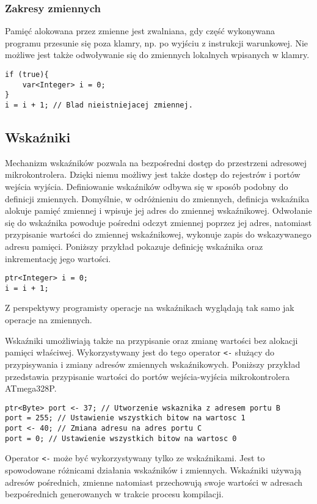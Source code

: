 \subsubsection{Zakresy zmiennych}
Pamięć alokowana przez zmienne jest zwalniana, gdy część wykonywana programu przesunie się poza klamry, np. po wyjściu z instrukcji warunkowej. Nie możliwe jest także odwoływanie się do zmiennych lokalnych wpisanych w klamry.
\begin{lstlisting}
if (true){
	var<Integer> i = 0;
}
i = i + 1; // Blad nieistniejacej zmiennej.
\end{lstlisting}
\subsection{Wskaźniki}
Mechanizm wskaźników pozwala na bezpośredni dostęp do przestrzeni adresowej mikrokontrolera. Dzięki niemu możliwy jest także dostęp do rejestrów i portów wejścia wyjścia.
Definiowanie wskaźników odbywa się w sposób podobny do definicji zmiennych. Domyślnie, w odróżnieniu do zmiennych, definicja wskaźnika alokuje pamięć zmiennej i wpisuje jej adres do zmiennej wskaźnikowej. Odwołanie się do wskaźnika powoduje pośredni odczyt zmiennej poprzez jej adres, natomiast przypisanie wartości do zmiennej wskaźnikowej, wykonuje zapis do wskazywanego adresu pamięci. Poniższy przykład pokazuje definicję wskaźnika oraz inkrementację jego wartości.
\begin{lstlisting}
ptr<Integer> i = 0;
i = i + 1;
\end{lstlisting}
Z perspektywy programisty operacje na wskaźnikach wyglądają tak samo jak operacje na zmiennych.

Wskaźniki umożliwiają także na przypisanie oraz zmianę wartości bez alokacji pamięci właściwej. Wykorzystywany jest do tego operator \lstinline|<-| służący do przypisywania i zmiany adresów zmiennych wskaźnikowych. Poniższy przykład przedstawia przypisanie wartości do portów wejścia-wyjścia mikrokontrolera ATmega328P.
\begin{lstlisting}
ptr<Byte> port <- 37; // Utworzenie wskaznika z adresem portu B
port = 255; // Ustawienie wszystkich bitow na wartosc 1
port <- 40; // Zmiana adresu na adres portu C
port = 0; // Ustawienie wszystkich bitow na wartosc 0
\end{lstlisting}
Operator \lstinline|<-| może być wykorzystywany tylko ze wskaźnikami. Jest to spowodowane różnicami działania wskaźników i zmiennych. Wskaźniki używają adresów pośrednich, zmienne natomiast przechowują swoje wartości w adresach bezpośrednich generowanych w trakcie procesu kompilacji.

